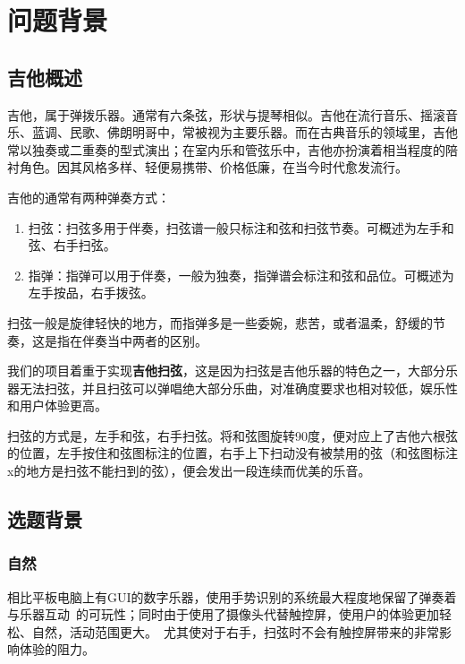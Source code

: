 \chapter{问题背景}

    \section{吉他概述}
    吉他，属于弹拨乐器。通常有六条弦，形状与提琴相似。吉他在流行音乐、摇滚音乐、蓝调、民歌、佛朗明哥中，常被视为主要乐器。而在古典音乐的领域里，吉他常以独奏或二重奏的型式演出；在室内乐和管弦乐中，吉他亦扮演着相当程度的陪衬角色。因其风格多样、轻便易携带、价格低廉，在当今时代愈发流行。


    吉他的通常有两种弹奏方式：

    \begin{enumerate}
        \item{扫弦}：扫弦多用于伴奏，扫弦谱一般只标注和弦和扫弦节奏。可概述为左手和弦、右手扫弦。
        \item{指弹}：指弹可以用于伴奏，一般为独奏，指弹谱会标注和弦和品位。可概述为左手按品，右手拨弦。
    \end{enumerate}


    扫弦一般是旋律轻快的地方，而指弹多是一些委婉，悲苦，或者温柔，舒缓的节奏，这是指在伴奏当中两者的区别。

    我们的项目着重于实现\textbf{吉他扫弦}，这是因为扫弦是吉他乐器的特色之一，大部分乐器无法扫弦，并且扫弦可以弹唱绝大部分乐曲，对准确度要求也相对较低，娱乐性和用户体验更高。

    扫弦的方式是，左手和弦，右手扫弦。将和弦图旋转90度，便对应上了吉他六根弦的位置，左手按住和弦图标注的位置，右手上下扫动没有被禁用的弦（和弦图标注x的地方是扫弦不能扫到的弦），便会发出一段连续而优美的乐音。


    \section{选题背景}

        \subsection{自然}
        相比平板电脑上有GUI的数字乐器，使用手势识别的系统最大程度地保留了弹奏着与乐器互动\
        的可玩性；同时由于使用了摄像头代替触控屏，使用户的体验更加轻松、自然，活动范围更大。\
        尤其使对于右手，扫弦时不会有触控屏带来的非常影响体验的阻力。

